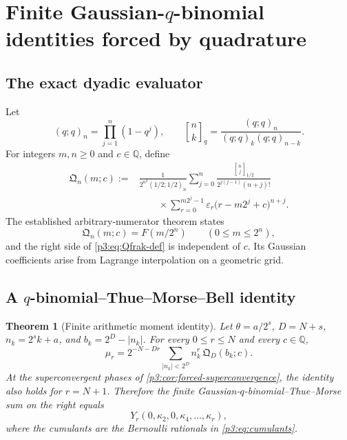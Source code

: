 \documentclass[11pt,oneside]{article}
\numberwithin{equation}{section}
\newtheorem{theorem}{Theorem}[section]
\theoremstyle{definition}
\theoremstyle{remark}
\newcommand{\Q}{\mathbb Q}
\newcommand{\eps}{\varepsilon}
\newcommand{\qbinom}[3]{\genfrac{[}{]}{0pt}{}{#1}{#2}_{#3}}
\newcommand{\abs}[1]{\left|#1\right|}
\begin{document}
\section{Finite Gaussian-$q$-binomial identities forced by quadrature}
\label{p3:sec:qbinomial}

\subsection{The exact dyadic evaluator}

Let
\begin{equation}
 (q;q)_n=\prod_{j=1}^{n}(1-q^j),
 \qquad
 \qbinom{n}{k}{q}=\frac{(q;q)_n}{(q;q)_k(q;q)_{n-k}}.
 \label{p3:eq:q-notation-report}
\end{equation}
For integers $m,n\ge0$ and $c\in\Q$, define
\begin{equation}
\begin{aligned}
 \mathfrak Q_n(m;c)
 :={}&\frac{1}{2^{n^2}(1/2;1/2)_n}
 \sum_{j=0}^{n}
 \frac{\qbinom{n}{j}{1/2}}
      {2^{j(j-1)}(n+j)!}\\
 &\qquad\times
 \sum_{r=0}^{m2^j-1}\eps_r
 \bigl(r-m2^j+c\bigr)^{n+j}.
 \label{p3:eq:Qfrak-def}
\end{aligned}
\end{equation}
The established arbitrary-numerator theorem states
\begin{equation}
 \mathfrak Q_n(m;c)=F(m/2^n)
 \qquad(0\le m\le2^n),
 \label{p3:eq:Qfrak-F}
\end{equation}
and the right side of \eqref{p3:eq:Qfrak-def} is independent of $c$.  Its Gaussian coefficients arise from Lagrange interpolation on a geometric grid.

\subsection{A $q$-binomial--Thue--Morse--Bell identity}

\begin{theorem}[Finite arithmetic moment identity]
\label{p3:thm:qbinomial-moment-identity}
Let $\theta=a/2^s$, $D=N+s$, $n_k=2^sk+a$, and $b_k=2^D-\abs{n_k}$.  For every $0\le r\le N$ and every $c\in\Q$,
\begin{equation}
 \boxed{\displaystyle
 \mu_r
 =2^{-N-Dr}
 \sum_{\abs{n_k}<2^D}
 n_k^r\,\mathfrak Q_D(b_k;c).}
 \label{p3:eq:qbinomial-moment-identity}
\end{equation}
At the superconvergent phases of \cref{p3:cor:forced-superconvergence}, the identity also holds for $r=N+1$.  Therefore the finite Gaussian-$q$-binomial--Thue--Morse sum on the right equals
\begin{equation}
 Y_r(0,\kappa_2,0,\kappa_4,\ldots,\kappa_r),
 \label{p3:eq:qbinomial-Bell-right}
\end{equation}
where the cumulants are the Bernoulli rationals in \eqref{p3:eq:cumulants}.
\end{theorem}
\end{document}
